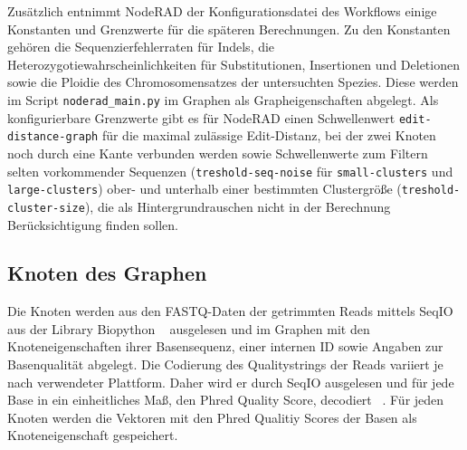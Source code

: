 Zusätzlich entnimmt NodeRAD der Konfigurationsdatei des Workflows einige Konstanten und Grenzwerte für die späteren Berechnungen. Zu den Konstanten gehören die Sequenzierfehlerraten für Indels, die Heterozygotiewahrscheinlichkeiten für Substitutionen, Insertionen und Deletionen sowie die Ploidie des Chromosomensatzes der untersuchten Spezies. Diese werden im Script \lstinline|noderad_main.py| im Graphen als Grapheigenschaften abgelegt. Als konfigurierbare Grenzwerte gibt es für NodeRAD einen Schwellenwert \linebreak \lstinline|edit-distance-graph| für die maximal zulässige Edit-Distanz, bei der zwei Knoten noch durch eine Kante verbunden werden sowie Schwellenwerte zum Filtern selten vorkommender Sequenzen (\lstinline|treshold-seq-noise| für \lstinline|small-clusters| und \lstinline|large-clusters|) ober- und unterhalb einer bestimmten Clustergröße (\lstinline|treshold-cluster-size|), die als Hintergrundrauschen nicht in der Berechnung Berücksichtigung finden sollen. \\

\subsection{Knoten des Graphen} \label{subsec:nodes}

Die Knoten werden aus den FASTQ-Daten der getrimmten Reads mittels SeqIO aus der Library Biopython ~\cite{cock_2009_1} ausgelesen und im Graphen mit den Knoteneigenschaften ihrer Basensequenz, einer internen ID sowie Angaben zur Basenqualität abgelegt. Die Codierung des Qualitystrings der Reads variiert je nach verwendeter Plattform. Daher wird er durch SeqIO ausgelesen und für jede Base in ein einheitliches Maß, den Phred Quality Score, decodiert ~\cite{cock_2009_2}. Für jeden Knoten werden die Vektoren mit den Phred Qualitiy Scores der Basen als Knoteneigenschaft gespeichert. \\

